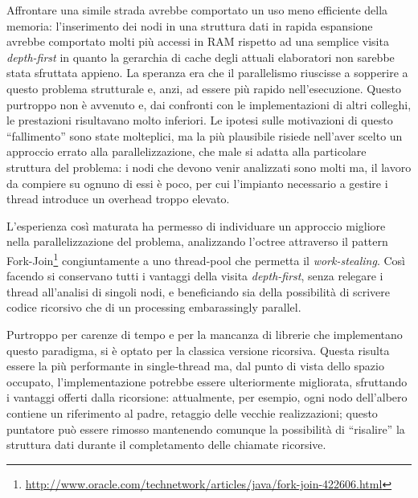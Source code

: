 Affrontare una simile strada avrebbe comportato un uso meno efficiente della memoria: l'inserimento dei nodi in una struttura dati in rapida espansione avrebbe comportato molti più accessi in RAM rispetto ad una semplice visita \emph{depth-first} in quanto la gerarchia di cache degli attuali elaboratori non sarebbe stata sfruttata appieno. La speranza era che il parallelismo riuscisse a sopperire a questo problema strutturale e, anzi, ad essere più rapido nell'esecuzione. Questo purtroppo non è avvenuto e, dai confronti con le implementazioni di altri colleghi, le prestazioni risultavano molto inferiori. Le ipotesi sulle motivazioni di questo ``fallimento'' sono state molteplici, ma la più plausibile risiede nell'aver scelto un approccio errato alla parallelizzazione, che male si adatta alla particolare struttura del problema: i nodi che devono venir analizzati sono molti ma, il lavoro da compiere su ognuno di essi è poco, per cui l'impianto necessario a gestire i thread introduce un overhead troppo elevato.

L'esperienza così maturata ha permesso di individuare un approccio migliore nella parallelizzazione del problema, analizzando l'octree attraverso il pattern Fork-Join\footnote{\url{http://www.oracle.com/technetwork/articles/java/fork-join-422606.html}} congiuntamente a uno thread-pool che permetta il \emph{work-stealing}. Così facendo si conservano tutti i vantaggi della visita \emph{depth-first}, senza relegare i thread all'analisi di singoli nodi, e beneficiando sia della possibilità di scrivere codice ricorsivo che di un processing embarassingly parallel.

Purtroppo per carenze di tempo e per la mancanza di librerie che implementano questo paradigma, si è optato per la classica versione ricorsiva. Questa risulta essere la più performante in single-thread ma, dal punto di vista dello spazio occupato, l'implementazione potrebbe essere ulteriormente migliorata, sfruttando i vantaggi offerti dalla ricorsione: attualmente, per esempio, ogni nodo dell'albero contiene un riferimento al padre, retaggio delle vecchie realizzazioni; questo puntatore può essere rimosso mantenendo comunque la possibilità di ``risalire'' la struttura dati durante il completamento delle chiamate ricorsive.

